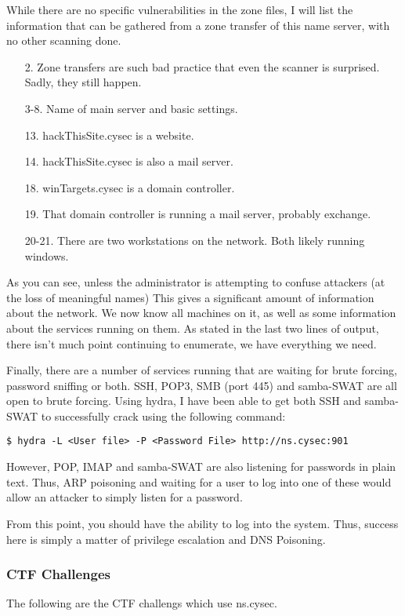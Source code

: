 				While there are no specific vulnerabilities in the zone files, I will list the information that can be gathered from a zone transfer of this name server, with no other scanning done. 
				
				\begin{enumerate}
					\item[2.] Zone transfers are such bad practice that even the scanner is surprised. Sadly, they still happen. 
					\item[3-8.] Name of main server and basic settings.
					\item[13.] hackThisSite.cysec is a website. 
					\item[14.] hackThisSite.cysec is also a mail server. 
					\item[18.] winTargets.cysec is a domain controller. 
					\item[19.] That domain controller is running a mail server, probably exchange. 
					\item[20-21.] There are two workstations on the network. Both likely running windows. 
				\end{enumerate}
				As you can see, unless the administrator is attempting to confuse attackers (at the loss of meaningful names)
				This gives a significant amount of information about the network. 
				We now know all machines on it, as well as some information about the services running on them. 
				As stated in the last two lines of output, there isn't much point continuing to enumerate, we have everything we need. 

				Finally, there are a number of services running that are waiting for brute forcing, password sniffing or both. 
				SSH, POP3, SMB (port 445) and samba-SWAT are all open to brute forcing. 
				Using hydra, I have been able to get both SSH and samba-SWAT to successfully crack using the following command:
				\begin{lstlisting}[style=CLI]
					$ hydra -L <User file> -P <Password File> http://ns.cysec:901
				\end{lstlisting}
					
				However, POP, IMAP and samba-SWAT are also listening for passwords in plain text. 
				Thus, ARP poisoning and waiting for a user to log into one of these would allow an attacker to simply listen for a password. 

				From this point, you should have the ability to log into the system. 
				Thus, success here is simply a matter of privilege escalation and DNS Poisoning. 
			\subsubsection{CTF Challenges}
				The following are the CTF challengs which use ns.cysec.
